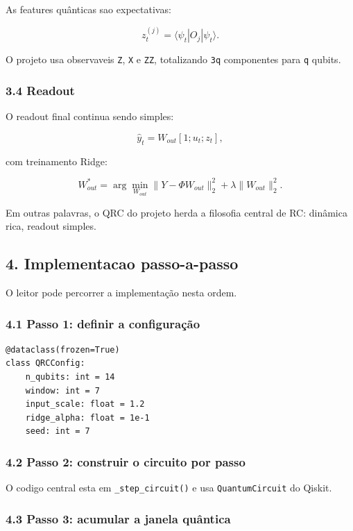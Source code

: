 \documentclass[12pt]{article}
\begin{document}
As features quânticas sao expectativas:

\[
z_t^{(j)} = \langle \psi_t | O_j | \psi_t \rangle.
\]

O projeto usa observaveis \texttt{Z}, \texttt{X} e \texttt{ZZ}, totalizando \texttt{3q} componentes para \texttt{q} qubits.

\subsubsection{3.4 Readout}\label{34-readout}

O readout final continua sendo simples:

\[
\hat{y}_t = W_{out} [1; u_t; z_t],
\]

com treinamento Ridge:

\[
W_{out}^* = \arg\min_{W_{out}} \|Y - \Phi W_{out}\|_2^2 + \lambda \|W_{out}\|_2^2.
\]

Em outras palavras, o QRC do projeto herda a filosofia central de RC: dinâmica rica, readout simples.

\subsection{4. Implementacao passo-a-passo}\label{4-implementacao-passo-a-passo}

O leitor pode percorrer a implementação nesta ordem.

\subsubsection{4.1 Passo 1: definir a configuração}\label{41-passo-1-definir-a-configurauxe7uxe3o}

\begin{verbatim}
@dataclass(frozen=True)
class QRCConfig:
    n_qubits: int = 14
    window: int = 7
    input_scale: float = 1.2
    ridge_alpha: float = 1e-1
    seed: int = 7
\end{verbatim}

\subsubsection{4.2 Passo 2: construir o circuito por passo}\label{42-passo-2-construir-o-circuito-por-passo}

O codigo central esta em \texttt{\_step\_circuit()} e usa \texttt{QuantumCircuit} do Qiskit.

\subsubsection{4.3 Passo 3: acumular a janela quântica}\label{43-passo-3-acumular-a-janela-quuxe2ntica}
\end{document}
